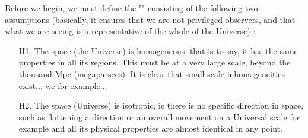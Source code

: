 	Before we begin, we must define the "" consisting of the following two assumptions (basically, it ensures that we are not privileged observers, and that what we are seeing is a representative of the whole of the Universe) :
	
	\pagebreak
	\begin{itemize}
		\item[H1.] The space (the Universe) is homogeneous, that is to say, it has the same properties in all its regions. This must be at a very large scale, beyond the thousand Mpc (megaparsecs). It is clear that small-scale inhomogeneities exist... we for example... \Winkey
		
		\item[H2.] The space (Universe) is isotropic, ie there is no specific direction in space, such as flattening a direction or an overall movement on a Universal scale for example and all its physical properties are almost identical in any point.
	\end{itemize}
	
